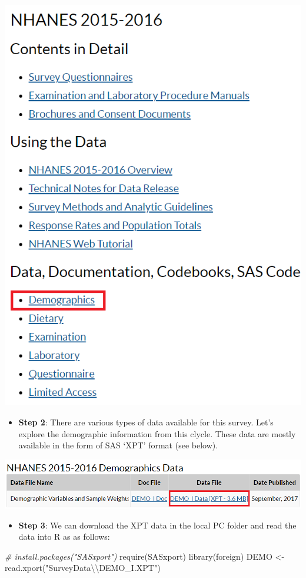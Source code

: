 \documentclass[
]{book}
\newenvironment{Shaded}{\begin{snugshade}}{\end{snugshade}}
\newcommand{\CommentTok}[1]{\textcolor[rgb]{0.56,0.35,0.01}{\textit{#1}}}
\newcommand{\FunctionTok}[1]{\textcolor[rgb]{0.00,0.00,0.00}{#1}}
\newcommand{\NormalTok}[1]{#1}
\newcommand{\OtherTok}[1]{\textcolor[rgb]{0.56,0.35,0.01}{#1}}
\newcommand{\SpecialCharTok}[1]{\textcolor[rgb]{0.00,0.00,0.00}{#1}}
\newcommand{\StringTok}[1]{\textcolor[rgb]{0.31,0.60,0.02}{#1}}
\providecommand{\tightlist}{%
  \setlength{\itemsep}{0pt}\setlength{\parskip}{0pt}}
\begin{document}
\includegraphics[width=0.65\linewidth]{images/n15demo}

\begin{itemize}
\tightlist
\item
  \textbf{Step 2}: There are various types of data available for this survey. Let's explore the demographic information from this clycle. These data are mostly available in the form of SAS `XPT' format (see below).
\end{itemize}

\includegraphics[width=0.65\linewidth]{images/xptsasdata}

\begin{itemize}
\tightlist
\item
  \textbf{Step 3}: We can download the XPT data in the local PC folder and read the data into R as as follows:
\end{itemize}

\begin{Shaded}
\begin{Highlighting}[]
\CommentTok{\# install.packages("SASxport")}
\FunctionTok{require}\NormalTok{(SASxport)}
\FunctionTok{library}\NormalTok{(foreign)}
\NormalTok{DEMO }\OtherTok{\textless{}{-}} \FunctionTok{read.xport}\NormalTok{(}\StringTok{"SurveyData}\SpecialCharTok{\textbackslash{}\textbackslash{}}\StringTok{DEMO\_I.XPT"}\NormalTok{)}
\end{Highlighting}
\end{Shaded}
\end{document}
